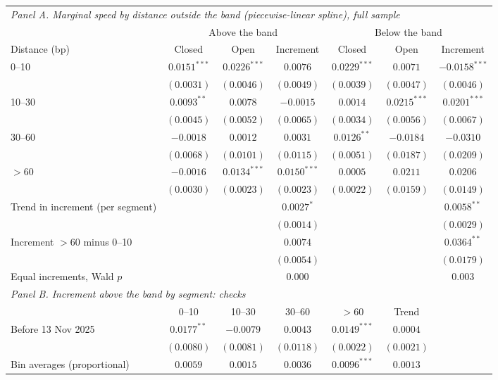 \begin{tabular}{lcccccc}
\toprule
\multicolumn{7}{l}{\emph{Panel A. Marginal speed by distance outside the band (piecewise-linear spline), full sample}} \\
 & \multicolumn{3}{c}{Above the band} & \multicolumn{3}{c}{Below the band} \\
\cmidrule(lr){2-4}\cmidrule(lr){5-7}
Distance (bp) & Closed & Open & Increment & Closed & Open & Increment \\
\midrule
0--10 & $0.0151^{***}$ & $0.0226^{***}$ & $0.0076$ & $0.0229^{***}$ & $0.0071$ & $-0.0158^{***}$ \\
 & $(0.0031)$ & $(0.0046)$ & $(0.0049)$ & $(0.0039)$ & $(0.0047)$ & $(0.0046)$ \\
10--30 & $0.0093^{**}$ & $0.0078$ & $-0.0015$ & $0.0014$ & $0.0215^{***}$ & $0.0201^{***}$ \\
 & $(0.0045)$ & $(0.0052)$ & $(0.0065)$ & $(0.0034)$ & $(0.0056)$ & $(0.0067)$ \\
30--60 & $-0.0018$ & $0.0012$ & $0.0031$ & $0.0126^{**}$ & $-0.0184$ & $-0.0310$ \\
 & $(0.0068)$ & $(0.0101)$ & $(0.0115)$ & $(0.0051)$ & $(0.0187)$ & $(0.0209)$ \\
$>$60 & $-0.0016$ & $0.0134^{***}$ & $0.0150^{***}$ & $0.0005$ & $0.0211$ & $0.0206$ \\
 & $(0.0030)$ & $(0.0023)$ & $(0.0023)$ & $(0.0022)$ & $(0.0159)$ & $(0.0149)$ \\
Trend in increment (per segment) &  &  & $0.0027^{*}$ &  &  & $0.0058^{**}$ \\
 &  &  & $(0.0014)$ &  &  & $(0.0029)$ \\
Increment $>$60 minus 0--10 &  &  & $0.0074$ &  &  & $0.0364^{**}$ \\
 &  &  & $(0.0054)$ &  &  & $(0.0179)$ \\
Equal increments, Wald $p$ & & & 0.000 & & & 0.003 \\
\midrule
\multicolumn{7}{l}{\emph{Panel B. Increment above the band by segment: checks}} \\
 & 0--10 & 10--30 & 30--60 & $>$60 & Trend & \\
\midrule
Before 13 Nov 2025 & $0.0177^{**}$ & $-0.0079$ & $0.0043$ & $0.0149^{***}$ & $0.0004$ & \\
 & $(0.0080)$ & $(0.0081)$ & $(0.0118)$ & $(0.0022)$ & $(0.0021)$ & \\
Bin averages (proportional) & $0.0059$ & $0.0015$ & $0.0036$ & $0.0096^{***}$ & $0.0013$ & \\

\end{tabular}
